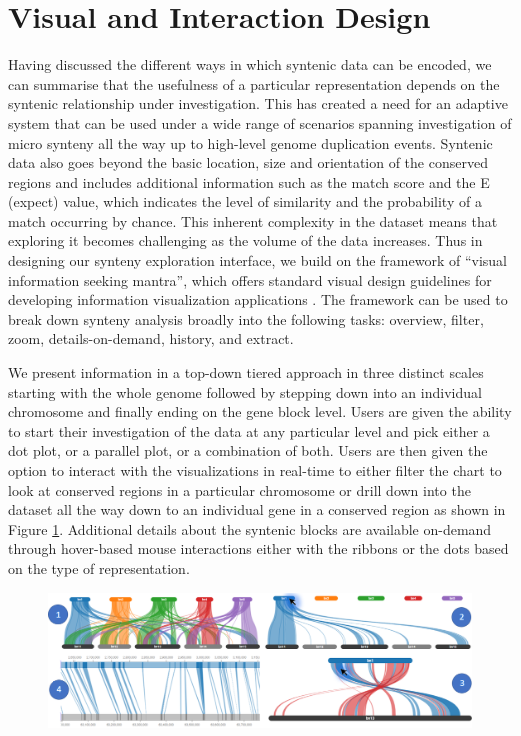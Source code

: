 \section{Visual and Interaction Design}

Having discussed the different ways in which syntenic data can be encoded, we can summarise that the usefulness of a particular representation depends on the syntenic relationship under investigation. This has created a need for an adaptive system that can be used under a wide range of scenarios spanning investigation of micro synteny all the way up to high-level genome duplication events. Syntenic data also goes beyond the basic location, size and orientation of the conserved regions and includes additional information such as the match score and the E (expect) value, which indicates the level of similarity and the probability of a match occurring by chance. This inherent complexity in the dataset means that exploring it becomes challenging as the volume of the data increases. Thus in designing our synteny exploration interface, we build on the framework of ``visual information seeking mantra'', which offers standard visual design guidelines for developing information visualization applications \cite{Shneiderman96theeyes}. The framework can be used to break down synteny analysis broadly into the following tasks: overview, filter, zoom, details-on-demand, history, and extract.

We present information in a top-down tiered approach in three distinct scales starting with the whole genome followed by stepping down into an individual chromosome and finally ending on the gene block level. Users are given the ability to start their investigation of the data at any particular level and pick either a dot plot, or a parallel plot, or a combination of both. Users are then given the option to interact with the visualizations in real-time to either filter the chart to look at conserved regions in a particular chromosome or drill down into the dataset all the way down to an individual gene in a conserved region as shown in Figure \ref{fig:ch_4_exploration_through_interaction}. Additional details about the syntenic blocks are available on-demand through hover-based mouse interactions either with the ribbons or the dots based on the type of representation.

\begin{figure}[h]
  \centering
  \includegraphics[width=1\linewidth]{images/ch_4_exploration_through_interaction.PNG}
  \label{fig:ch_4_exploration_through_interaction}
\end{figure}


